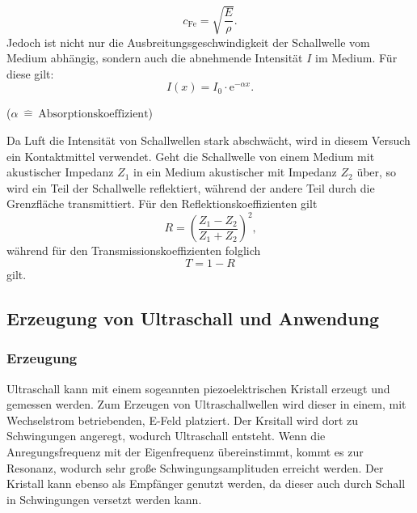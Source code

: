 \begin{equation}
  c_\text{{Fe}}=\sqrt{\frac{E}{\rho}} \label{eq:Fe} \text{.}
\end{equation}
Jedoch ist nicht nur die Ausbreitungsgeschwindigkeit der Schallwelle vom Medium abhängig, sondern auch die abnehmende Intensität $I$ im Medium.
Für diese gilt:
\begin{equation}
  I(x)=I_0\cdot\mathrm{e}^{-\alpha x}\label{eq:I} \text{.}
\end{equation}
\begin{center}
  \tiny {($\alpha \: \hat{=} \:\text{Absorptionskoeffizient}$)}
\end{center}
Da Luft die Intensität von Schallwellen stark abschwächt, wird in diesem Versuch ein Kontaktmittel verwendet.
Geht die Schallwelle von einem Medium mit akustischer Impedanz $Z_1$ in ein Medium akustischer mit Impedanz $Z_2$ über, so wird ein Teil der Schallwelle reflektiert, während der andere Teil durch
die Grenzfläche transmittiert.
Für den Reflektionskoeffizienten gilt
\begin{equation}
R=\left(\frac{Z_1-Z_2}{Z_1+Z_2}\right)^2 \text{,} \label{eq:R}
\end{equation} während für den Transmissionskoeffizienten folglich
\begin{equation}
  T=1-R
\end{equation}
gilt.

\subsection{Erzeugung von Ultraschall und Anwendung}
\subsubsection{Erzeugung}
Ultraschall kann mit einem sogeannten piezoelektrischen Kristall erzeugt und gemessen werden.
Zum Erzeugen von Ultraschallwellen wird dieser in einem, mit Wechselstrom betriebenden, E-Feld platziert. Der Krsitall wird dort zu Schwingungen angeregt, wodurch Ultraschall entsteht.
Wenn die Anregungsfrequenz mit der Eigenfrequenz übereinstimmt, kommt es zur Resonanz, wodurch sehr große Schwingungsamplituden erreicht werden.
Der Kristall kann ebenso als Empfänger genutzt werden, da dieser auch durch Schall in Schwingungen versetzt werden kann.
